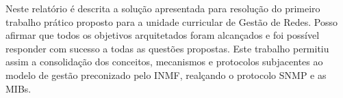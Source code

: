 \documentclass[../momento_1.tex]{subfiles}
\begin{document}
\par Neste relatório é descrita a solução apresentada para resolução do primeiro trabalho prático proposto para a unidade curricular de Gestão de Redes.
Posso afirmar que todos os objetivos arquitetados foram alcançados e foi possível responder com sucesso a todas as questões propostas. Este trabalho permitiu assim a consolidação dos conceitos, mecanismos e protocolos subjacentes ao modelo de gestão preconizado pelo INMF, realçando o
protocolo SNMP e as MIBs. 
\end{document}
